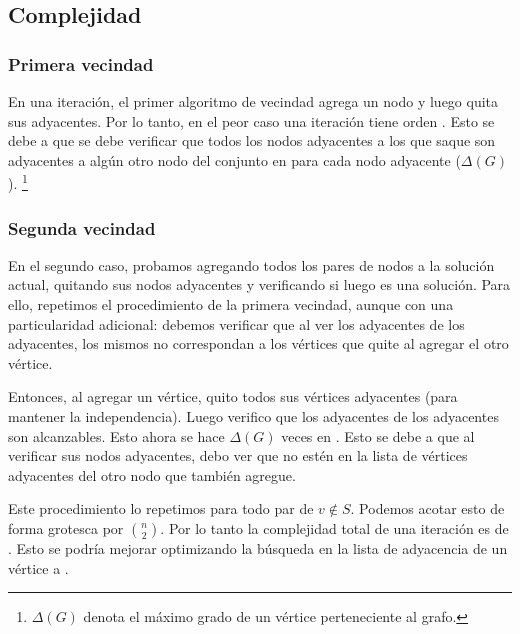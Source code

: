 \subsection{Complejidad}

\subsubsection{Primera vecindad}

En una iteración, el primer algoritmo de vecindad agrega un nodo y luego quita sus adyacentes. Por lo tanto, en el peor caso una iteración tiene orden . Esto se debe a que se debe verificar que todos los nodos adyacentes a los que saque son adyacentes a algún otro nodo del conjunto en  para cada nodo adyacente ($\Delta(G)$). \footnote{$\Delta(G)$ denota el máximo grado de un vértice perteneciente al grafo.}

\subsubsection{Segunda vecindad}

En el segundo caso, probamos agregando todos los pares de nodos a la solución actual, quitando sus nodos adyacentes y verificando si luego es una solución. Para ello, repetimos el procedimiento de la primera vecindad, aunque con una particularidad adicional: debemos verificar que al ver los adyacentes de los adyacentes, los mismos no correspondan a los vértices que quite al agregar el otro vértice.

Entonces, al agregar un vértice, quito todos sus vértices adyacentes (para mantener la independencia). Luego verifico que los adyacentes de los adyacentes son alcanzables. Esto ahora se hace $\Delta(G)$ veces en . Esto se debe a que al verificar sus nodos adyacentes, debo ver que no estén en la lista de vértices adyacentes del otro nodo que también agregue.

Este procedimiento lo repetimos para todo par de $v \not\in S$. Podemos acotar esto de forma grotesca por $\binom{n}{2}$. Por lo tanto la complejidad total de una iteración es de . Esto se podría mejorar optimizando la búsqueda en la lista de adyacencia de un vértice a .
